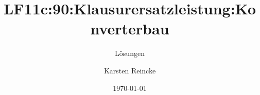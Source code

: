 \documentclass[]{beamer}
\title{LF11c:90:Klausurersatzleistung:Konverterbau}
\subtitle{Lösungen}
\institute{GS-LDK}
\author{Karsten Reincke}
\date{\today}
\def\cfgGl{../../../cfg.gl/}
\begin{document}

\begin{frame}
  \titlepage
\end{frame}






\logo{}
\newpage




\end{document}
